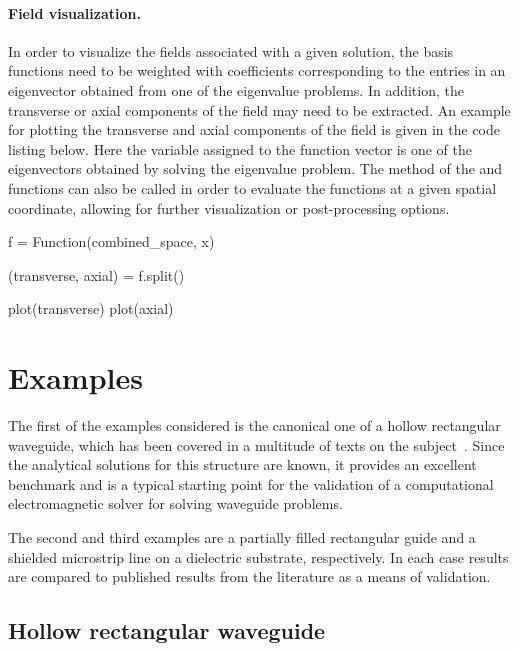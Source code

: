 \paragraph{Field visualization.}

In order to visualize the fields associated with a given solution, the
basis functions need to be weighted with coefficients corresponding to
the entries in an eigenvector obtained from one of the eigenvalue
problems. In addition, the transverse or axial components of the field
may need to be extracted. An example for plotting the transverse and
axial components of the field is given in the code listing below.
Here the variable  assigned to the function vector is one of
the eigenvectors obtained by solving the eigenvalue
problem. The  method of the  and 
functions can also be called in order to evaluate the functions at a
given spatial coordinate, allowing for further visualization or
post-processing options.
\begin{python}
f = Function(combined_space, x)

(transverse, axial) = f.split()

plot(transverse)
plot(axial)
\end{python}

\section{Examples}
\label{lezar:sec:Examples}

The first of the examples considered is the canonical one of a hollow
rectangular waveguide, which has been covered in a multitude of texts
on the subject~\citep{Davidson2011, Jin2002,
PelosiCoccioliSelleri1998, Pozar2005}. Since the analytical solutions
for this structure are known, it provides an excellent benchmark and
is a typical starting point for the validation of a computational
electromagnetic solver for solving waveguide problems.

The second and third examples are a partially filled rectangular guide
and a shielded microstrip line on a dielectric substrate,
respectively. In each case results are compared to published results
from the literature as a means of validation.

\subsection{Hollow rectangular waveguide}


